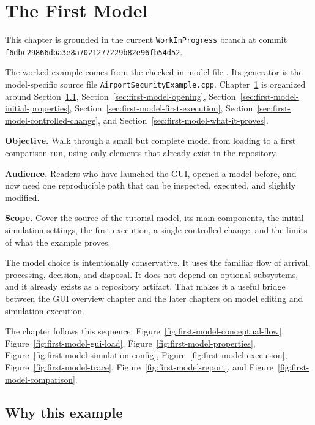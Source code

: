 \chapter{The First Model}
\label{chap:first-model}

This chapter is grounded in the current \texttt{WorkInProgress} branch at
commit \texttt{f6dbc298\allowbreak{}66dba3e8\allowbreak{}a7021277\allowbreak{}229b82e9\allowbreak{}6fb54d52}.

The worked example comes from the checked-in model file
.
Its generator is the model-specific source file
\texttt{AirportSecurityExample.cpp}.
Chapter~\ref{chap:first-model} is organized around
Section~\ref{sec:first-model-why-this-example},
Section~\ref{sec:first-model-opening},
Section~\ref{sec:first-model-initial-properties},
Section~\ref{sec:first-model-first-execution},
Section~\ref{sec:first-model-controlled-change}, and
Section~\ref{sec:first-model-what-it-proves}.

\noindent\textbf{Objective.} Walk through a small but complete model from
loading to a first comparison run, using only elements that already exist in
the repository.

\noindent\textbf{Audience.} Readers who have launched the GUI, opened a model
before, and now need one reproducible path that can be inspected, executed, and
slightly modified.

\noindent\textbf{Scope.} Cover the source of the tutorial model, its main
components, the initial simulation settings, the first execution, a single
controlled change, and the limits of what the example proves.

The model choice is intentionally conservative. It uses the familiar flow of
arrival, processing, decision, and disposal. It does not depend on optional
subsystems, and it already exists as a repository artifact. That makes it a
useful bridge between the GUI overview chapter and the later chapters on model
editing and simulation execution.

The chapter follows this sequence:
Figure~\ref{fig:first-model-conceptual-flow},
Figure~\ref{fig:first-model-gui-load},
Figure~\ref{fig:first-model-properties},
Figure~\ref{fig:first-model-simulation-config},
Figure~\ref{fig:first-model-execution},
Figure~\ref{fig:first-model-trace},
Figure~\ref{fig:first-model-report}, and
Figure~\ref{fig:first-model-comparison}.

\section{Why this example}
\label{sec:first-model-why-this-example}

